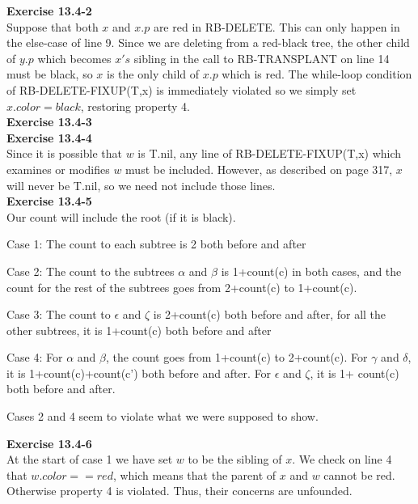 \documentclass{article}
\begin{document}
\noindent\textbf{Exercise 13.4-2}\\

Suppose that both $x$ and $x.p$ are red in RB-DELETE.  This can only happen in the else-case of line 9.  Since we are deleting from a red-black tree, the other child of $y.p$ which becomes $x's$ sibling in the call to RB-TRANSPLANT on line 14 must be black, so $x$ is the only child of $x.p$ which is red.  The while-loop condition of RB-DELETE-FIXUP(T,x) is immediately violated so we simply set $x.color = black$, restoring property 4. \\

\noindent\textbf{ Exercise 13.4-3} \\



\noindent\textbf{Exercise 13.4-4} \\

Since it is possible that $w$ is T.nil, any line of RB-DELETE-FIXUP(T,x) which examines or modifies $w$ must be included.  However, as described on page 317, $x$ will never be T.nil, so we need not include those lines. \\

\noindent\textbf{ Exercise 13.4-5} \\

Our count will include the root (if it is black).

Case 1: The count to each subtree is 2 both before and after

Case 2: The count to the subtrees $\alpha$ and $\beta$ is 1+count(c) in both cases, and the count for the rest of the subtrees goes from 2+count(c) to 1+count(c).

Case 3: The count to $\epsilon$ and $\zeta$ is 2+count(c) both before and after, for all the other subtrees, it is 1+count(c) both before and after

Case 4: For $\alpha$ and $\beta$, the count goes from 1+count(c) to 2+count(c). For $\gamma$ and $\delta$, it is 1+count(c)+count(c') both before and after. For $\epsilon$ and $\zeta$, it is 1+ count(c) both before and after.

Cases 2 and 4 seem to violate what we were supposed to show.

\noindent\textbf{Exercise 13.4-6}\\

At the start of case 1 we have set $w$ to be the sibling of $x$.  We check on line 4 that $w.color == red$, which means that the parent of $x$ and $w$ cannot be red.  Otherwise property 4 is violated.  Thus, their concerns are unfounded. \\
\end{document}
